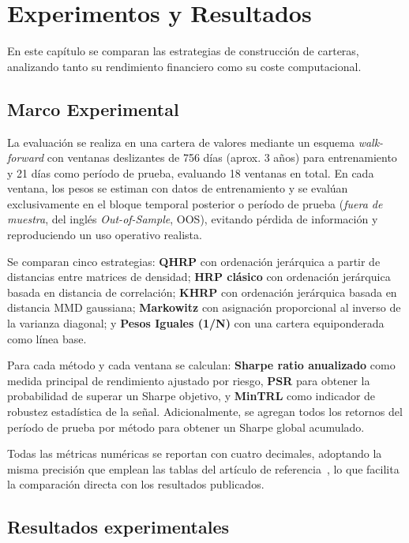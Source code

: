 \chapter{Experimentos y Resultados}
\label{cap:experimentos_resultados}

En este capítulo se comparan las estrategias de construcción de carteras, analizando tanto su rendimiento financiero como su coste computacional.

\section{Marco Experimental}
\label{sec:marco_experimental}

La evaluación se realiza en una cartera de valores mediante un esquema \textit{walk-forward} con ventanas deslizantes de 756 días (aprox. 3 años) para entrenamiento y 21 días como período de prueba, evaluando 18 ventanas en total. En cada ventana, los pesos se estiman con datos de entrenamiento y se evalúan exclusivamente en el bloque temporal posterior o período de prueba (\textit{fuera de muestra}, del inglés \textit{Out-of-Sample}, \gls{OOS}), evitando pérdida de información y reproduciendo un uso operativo realista.

Se comparan cinco estrategias: \textbf{\gls{QHRP}} con ordenación jerárquica a partir de distancias entre matrices de densidad; \textbf{\gls{HRP} clásico} con ordenación jerárquica basada en distancia de correlación; \textbf{\gls{KHRP}} con ordenación jerárquica basada en distancia \gls{MMD} gaussiana; \textbf{Markowitz} con asignación proporcional al inverso de la varianza diagonal; y \textbf{Pesos Iguales (1/N)} con una cartera equiponderada como línea base.

Para cada método y cada ventana se calculan: \textbf{Sharpe ratio anualizado} como medida principal de rendimiento ajustado por riesgo, \textbf{\gls{PSR}} para obtener la probabilidad de superar un Sharpe objetivo, y \textbf{\gls{MinTRL}} como indicador de robustez estadística de la señal. Adicionalmente, se agregan todos los retornos del período de prueba por método para obtener un Sharpe global acumulado.

Todas las métricas numéricas se reportan con cuatro decimales, adoptando la misma precisión que emplean las tablas del artículo de referencia~\cite{arian2025qhrp}, lo que facilita la comparación directa con los resultados publicados.

\section{Resultados experimentales}
\label{sec:resultados_experimentales}

